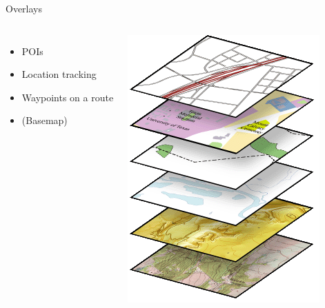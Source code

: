 \documentclass{beamer}
\begin{document}
\begin{frame}{Overlays}
 \begin{columns}
   \begin{itemize}
    \item POIs
    \item Location tracking
    \item Waypoints on a route
    \item (Basemap)
   \end{itemize}
   \includegraphics[scale=0.5]{images/basemap_layers}
 \end{columns}
\end{frame}
\end{document}
